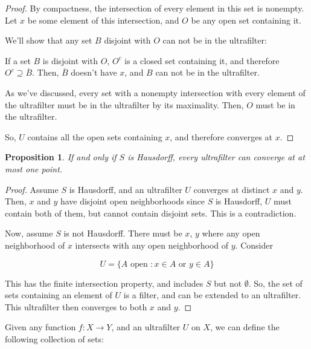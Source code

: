 \documentclass{article}
\newtheorem*{proposition}{Proposition}
\begin{document}
\begin{proof}
          By compactness, the intersection of every element in this set is
          nonempty. Let $x$ be some element of this intersection, and $O$ be any
          open set containing it.

          We'll show that any set $B$ disjoint with $O$ can not be in the
          ultrafilter:

          If a set $B$ is disjoint with $O$, $O^c$ is a closed set containing it,
          and therefore $O^c \supseteq \overline{B}$. Then, $\overline{B}$
          doesn't have $x$, and $B$ can not be in the ultrafilter.

          As we've discussed, every set with a nonempty intersection with every
          element of the ultrafilter must be in the ultrafilter by its
          maximality. Then, $O$ must be in the ultrafilter.

          So, $U$ contains all the open sets containing
          $x$, and therefore converges at $x$.
          \end{proof}

          \begin{proposition}
          If and only if $S$ is Hausdorff, every ultrafilter can converge at at
          most one point.
          \end{proposition}

          \begin{proof}
          Assume $S$ is Hausdorff, and an ultrafilter $U$ converges at distinct
          $x$ and $y$. Then, $x$ and $y$ have disjoint open neighborhoods since
          $S$ is Hausdorff, $U$ must contain both of them, but cannot contain
          disjoint sets. This is a contradiction.

          Now, assume $S$ is not Hausdorff. There must be $x$, $y$ where any
          open neighborhood of $x$ intersects with any open neighborhood of
          $y$. Consider

          \[U = \{A \text{ open }: x \in A \text{ or } y \in A\}\]

          This has the finite intersection property, and includes $S$ but not
          $\emptyset$. So, the set of sets containing an element of $U$ is a
          filter, and can be extended to an ultrafilter. This ultrafilter then
          converges to both $x$ and $y$.
          \end{proof}

          Given any function $f: X \to Y$, and an ultrafilter $U$ on $X$, we can
          define the following collection of sets:
\end{document}
